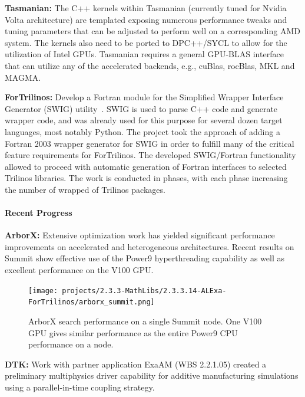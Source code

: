 {\bf Tasmanian:} The C++ kernels within Tasmanian (currently tuned for Nvidia
Volta architecture) are templated exposing numerous performance tweaks and
tuning parameters that can be adjusted to perform well on a corresponding AMD
system.
The kernels also need to be ported to DPC++/SYCL to allow for the utilization
of Intel GPUs. Tasmanian requires a general GPU-BLAS interface that can
utilize any of the accelerated backends, e.g., cuBlas, rocBlas, MKL and MAGMA.

{\bf ForTrilinos:} Develop a Fortran module for the Simplified Wrapper
Interface Generator (SWIG) utility~\cite{beazley1996swig}. SWIG is used to parse
C++ code and generate wrapper code, and was already used for this purpose for
several dozen target languages, most notably Python. The project took the
approach of adding a Fortran 2003 wrapper generator for SWIG in order to
fulfill many of the critical feature requirements for ForTrilinos.
The developed SWIG/Fortran functionality allowed to proceed with automatic
generation of Fortran interfaces to selected Trilinos libraries. The work is
conducted in phases, with each phase increasing the number of wrapped of
Trilinos packages.


\paragraph{Recent Progress}

\indent

{\bf ArborX:} Extensive optimization work has yielded significant performance
improvements on accelerated and heterogeneous architectures. Recent results on
Summit show effective use of the Power9 hyperthreading capability as well as
excellent performance on the V100 GPU.

\begin{figure}[htb]
        \centering \texttt{[image: projects/2.3.3-MathLibs/2.3.3.14-ALExa-ForTrilinos/arborx\_summit.png]} \caption{\label{fig:arborx-gpu}
        ArborX search performance on a single Summit node. One V100 GPU gives
        similar performance as the entire Power9 CPU performance on a node.}
\end{figure}

{\bf DTK:} Work with partner application ExaAM (WBS 2.2.1.05) created a
preliminary multiphysics driver capability for additive manufacturing
simulations using a parallel-in-time coupling strategy.


